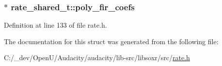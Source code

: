 \subsubsection[{\texorpdfstring{poly\+\_\+fir\+\_\+coefs}{poly_fir_coefs}}]{$\ast$ rate\+\_\+shared\+\_\+t\+::poly\+\_\+fir\+\_\+coefs}\hypertarget{structrate__shared__t_a1e41cf7aaf9fbb8b79616e2c18dac3f9}{}\label{structrate__shared__t_a1e41cf7aaf9fbb8b79616e2c18dac3f9}


Definition at line 133 of file rate.\+h.



The documentation for this struct was generated from the following file\+:\begin{DoxyCompactItemize}
\item 
C\+:/\+\_\+dev/\+Open\+U/\+Audacity/audacity/lib-\/src/libsoxr/src/\hyperlink{rate_8h}{rate.\+h}\end{DoxyCompactItemize}
